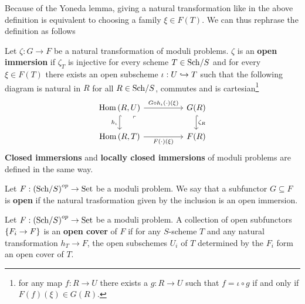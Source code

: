 Because of the Yoneda lemma, giving a natural transformation like in the above definition is equivalent to choosing a family $\xi\in F(T)$. We can thus rephrase the definition as follows

\begin{definition}
Let $\zeta:G\to F$ be a natural transformation of moduli problems. $\zeta$ is an \textbf{open immersion} if $\zeta_T$ is injective for every scheme $T\in{\mathrm{Sch}}/{S}$ and for every $\xi\in F(T)$ there exists an open subscheme $\iota:U\hookrightarrow T$ such that the following diagram is natural in $R$ for all $R\in {\mathrm{Sch}}/{S}$, commutes and is cartesian\footnote{for any map $f:R\to U$ there exists a $g:R\to U$ such that $f=\iota\circ g$ if and only if $F(f)(\xi)\in G(R)$.}
\[\begin{tikzcd}
	{\Hom(R,U)} && {G(R)} \\
	{\Hom(R,T)} && {F(R)}
	\arrow["{G\circ h_\iota(\cdot)(\xi)}", from=1-1, to=1-3]
	\arrow["{h_\iota}"', hook, from=1-1, to=2-1]
	\arrow["{\zeta_R}", hook, from=1-3, to=2-3]
	\arrow[""{name=0, anchor=center, inner sep=0}, "{F(\cdot)(\xi)}"', from=2-1, to=2-3]
	\arrow["\ulcorner"{anchor=center, pos=0.125}, draw=none, from=1-1, to=0]
\end{tikzcd}\]
\textbf{Closed immersions} and \textbf{locally closed immersions} of moduli problems are defined in the same way.
\end{definition}


\begin{definition}
Let $F:\left({\mathrm{Sch}}/{S}\right)^{op}\to \mathrm{Set}$ be a moduli problem. We say that a subfunctor $G\subseteq F$ is \textbf{open} if the natural trasformation given by the inclusion is an open immersion.
\end{definition}

\begin{definition}
Let $F:\left({\mathrm{Sch}}/{S}\right)^{op}\to \mathrm{Set}$ be a moduli problem. A collection of open subfunctors $\left\{{F_i\to F}\right\}$ is an \textbf{open cover} of $F$ if for any $S$-scheme $T$ and any natural transformation $h_T\to F$, the open subschemes $U_i$ of $T$ determined by the $F_i$ form an open cover of $T$.
\end{definition}



